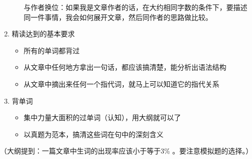 \documentclass[11pt,twoside,openany,x11names,svgnames]{memoir}
\begin{document}
\begin{enumerate}
\begin{itemize}
与作者换位：如果我是文章作者的话，在大约相同字数的条件下，要描述同一件事情，我会如何展开文章，然后同作者的思路做比较。
\end{itemize}
  \item 精读达到的基本要求
  \begin{itemize}
  \item 所有的单词都背过
  \item 从文章中任何地方拿出一句话，都应该搞清楚，能分析出语法结构
  \item 从文章中摘出来任何一个指代词，就马上可以知道它的指代关系
\end{itemize}
  \item 背单词
  \begin{itemize}
  \item 集中力量大面积的过单词（认知），用大纲就可以了
  \item 以真题为范本，搞清这些词在句中的深刻含义
\end{itemize}
\end{enumerate}
{\color{red}（大纲提到：一篇文章中生词的出现率应该小于等于3\% 。要注意模拟题的选择。）}
\end{document}
